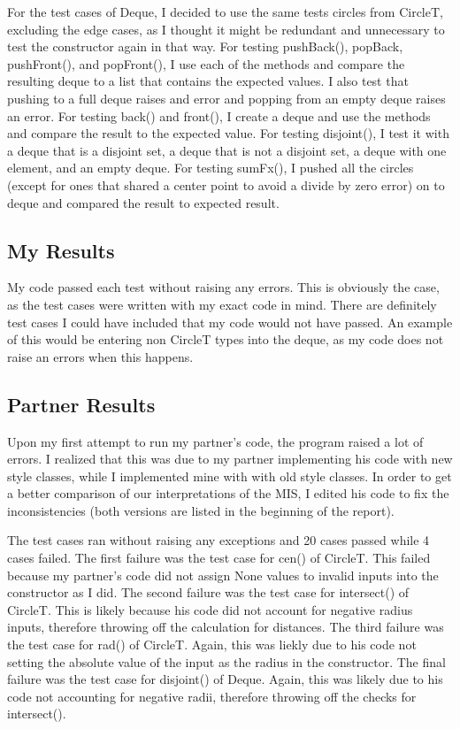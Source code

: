 \documentclass{article}
\begin{document}
{\indent For the test cases of Deque, I decided to use the same tests circles from CircleT, excluding the edge cases, as I thought it might be redundant and unnecessary to test the constructor again in that way. For testing pushBack(), popBack, pushFront(), and popFront(), I use each of the methods and compare the resulting deque to a list that contains the expected values. I also test that pushing to a full deque raises and error and popping from an empty deque raises an error. For testing back() and front(), I create a deque and use the methods and compare the result to the expected value. For testing disjoint(), I test it with a deque that is a disjoint set, a deque that is not a disjoint set, a deque with one element, and an empty deque. For testing sumFx(), I pushed all the circles (except for ones that shared a center point to avoid a divide by zero error) on to deque and compared the result to expected result.

}

\subsection{My Results}
{ 
\indent \indent My code passed each test without raising any errors. This is obviously the case, as the test cases were written with my exact code in mind. There are definitely test cases I could have included that my code would not have passed. An example of this would be entering non CircleT types into the deque, as my code does not raise an errors when this happens.

}

\subsection{Partner Results}
{ 
\indent \indent Upon my first attempt to run my partner's code, the program raised a lot of errors. I realized that this was due to my partner implementing his code with new style classes, while I implemented mine with with old style classes. In order to get a better comparison of our interpretations of the MIS, I edited his code to fix the inconsistencies (both versions are listed in the beginning of the report). 

\indent The test cases ran without raising any exceptions and 20 cases passed while 4 cases failed. The first failure was the test case for cen() of CircleT. This failed because my partner's code did not assign None values to invalid inputs into the constructor as I did. The second failure was the test case for intersect() of CircleT. This is likely because his code did not account for negative radius inputs, therefore throwing off the calculation for distances. The third failure was the test case for rad() of CircleT. Again, this was liekly due to his code not setting the absolute value of the input as the radius in the constructor. The final failure was the test case for disjoint() of Deque. Again, this was likely due to his code not accounting for negative radii, therefore throwing off the checks for intersect().

}
\end{document}
